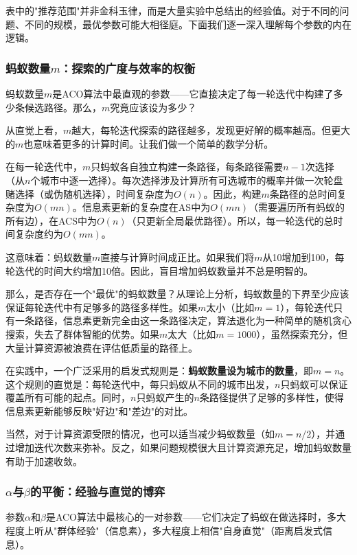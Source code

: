 \documentclass[lang=cn,zihao=-4,a4paper,fontset=windows]{beautybook}
\begin{document}
表中的"推荐范围"并非金科玉律，而是大量实验中总结出的经验值。对于不同的问题、不同的规模，最优参数可能大相径庭。下面我们逐一深入理解每个参数的内在逻辑。

\subsubsection{蚂蚁数量$m$：探索的广度与效率的权衡}

蚂蚁数量$m$是ACO算法中最直观的参数——它直接决定了每一轮迭代中构建了多少条候选路径。那么，$m$究竟应该设为多少？

从直觉上看，$m$越大，每轮迭代探索的路径越多，发现更好解的概率越高。但更大的$m$也意味着更多的计算时间。让我们做一个简单的数学分析。

在每一轮迭代中，$m$只蚂蚁各自独立构建一条路径，每条路径需要$n-1$次选择（从$n$个城市中逐一选择）。每次选择涉及计算所有可选城市的概率并做一次轮盘赌选择（或伪随机选择），时间复杂度为$O(n)$。因此，构建$m$条路径的总时间复杂度为$O(mn)$。信息素更新的复杂度在AS中为$O(mn)$（需要遍历所有蚂蚁的所有边），在ACS中为$O(n)$（只更新全局最优路径）。所以，每一轮迭代的总时间复杂度约为$O(mn)$。

这意味着：蚂蚁数量$m$直接与计算时间成正比。如果我们将$m$从10增加到100，每轮迭代的时间大约增加10倍。因此，盲目增加蚂蚁数量并不总是明智的。

那么，是否存在一个"最优"的蚂蚁数量？从理论上分析，蚂蚁数量的下界至少应该保证每轮迭代中有足够多的路径多样性。如果$m$太小（比如$m=1$），每轮迭代只有一条路径，信息素更新完全由这一条路径决定，算法退化为一种简单的随机贪心搜索，失去了群体智能的优势。如果$m$太大（比如$m=1000$），虽然探索充分，但大量计算资源被浪费在评估低质量的路径上。

在实践中，一个广泛采用的启发式规则是：\textbf{蚂蚁数量设为城市的数量}，即$m = n$。这个规则的直觉是：每轮迭代中，每只蚂蚁从不同的城市出发，$n$只蚂蚁可以保证覆盖所有可能的起点。同时，$n$只蚂蚁产生的$n$条路径提供了足够的多样性，使得信息素更新能够反映"好边"和"差边"的对比。

当然，对于计算资源受限的情况，也可以适当减少蚂蚁数量（如$m = n/2$），并通过增加迭代次数来弥补。反之，如果问题规模很大且计算资源充足，增加蚂蚁数量有助于加速收敛。

\subsubsection{$\alpha$与$\beta$的平衡：经验与直觉的博弈}

参数$\alpha$和$\beta$是ACO算法中最核心的一对参数——它们决定了蚂蚁在做选择时，多大程度上听从"群体经验"（信息素），多大程度上相信"自身直觉"（距离启发式信息）。
\end{document}
